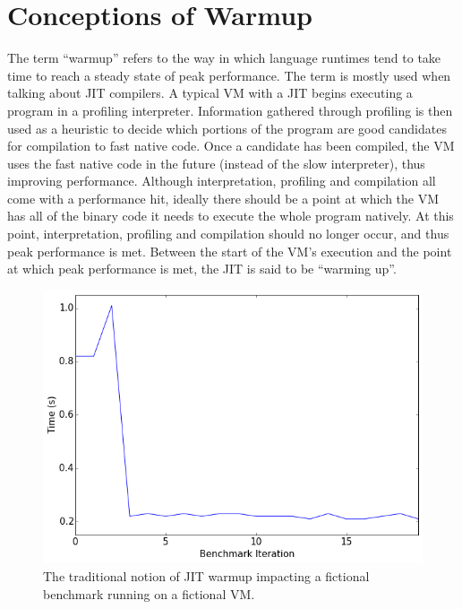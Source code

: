 \documentclass[10pt,preprint]{sigplanconf}
\begin{document}
\section{Conceptions of Warmup}
\label{sec:warmup}

The term ``warmup'' refers to the way in which language runtimes tend to take
time to reach a steady state of peak performance. The term is mostly used when
talking about JIT compilers. A typical VM
with a JIT begins executing a program in a profiling interpreter. Information
gathered through profiling is then used as a heuristic to decide which portions
of the program are good candidates for compilation to fast native code. Once a
candidate has been compiled, the VM uses the fast native code in the future
(instead of the slow interpreter), thus improving performance.  Although
interpretation, profiling and compilation all come with a performance hit,
ideally there should be a point at which the VM has all of the binary code it
needs to execute the whole program natively. At this point, interpretation,
profiling and compilation should no longer occur, and thus peak performance is
met. Between the start of the VM's execution and the point at which peak
performance is met, the JIT is said to be ``warming up''.

\begin{figure}[h!]
\centering
\includegraphics[width=.4\textwidth]{img/trad}
\caption{The traditional notion of JIT warmup impacting a fictional
benchmark running on a fictional VM.}
\label{fig:trad}
\end{figure}
\end{document}
